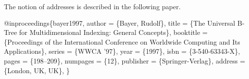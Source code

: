 The notion of addresses is described in the following paper. 
\begin{DoxyCode}
@inproceedings\{bayer1997,
  author = \{Bayer, Rudolf\},
  title = \{The Universal B-Tree \textcolor{keywordflow}{for} Multidimensional Indexing: General
      Concepts\},
  booktitle = \{Proceedings of the International Conference on Worldwide
      Computing and Its Applications\},
  series = \{WWCA \textcolor{stringliteral}{'97\},}
\textcolor{stringliteral}{  year = \{1997\},}
\textcolor{stringliteral}{  isbn = \{3-540-63343-X\},}
\textcolor{stringliteral}{  pages = \{198--209\},}
\textcolor{stringliteral}{  numpages = \{12\},}
\textcolor{stringliteral}{  publisher = \{Springer-Verlag\},}
\textcolor{stringliteral}{  address = \{London, UK, UK\},}
\textcolor{stringliteral}{\}}
\end{DoxyCode}
 